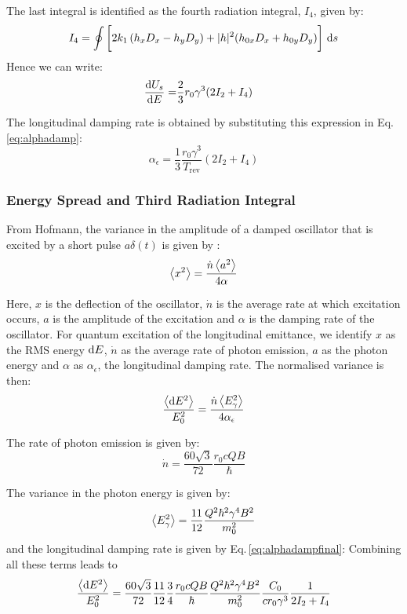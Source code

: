 The last integral is identified as the fourth radiation integral, $I_4$, given by:
\begin{equation}
    I_4 = \oint \bigg[2k_1 \left( h_x D_x - h_y D_y \right) + |h|^2 (h_{0x}D_x + h_{0y} D_y)\bigg] \ \text{d} s
\end{equation}
Hence we can write:
\begin{align}
    \frac{\text{d} {U_s}}{\text{d} {E}} = &\frac{2}{3} r_0 \gamma^3 (2I_2 + I_4 )
\end{align}

The longitudinal damping rate is obtained by substituting this expression in Eq.\,\eqref{eq:alphadamp}:
\begin{equation}
    \alpha_\epsilon =
      \frac{1}{3} \frac{r_0 \gamma^3}{T_\text{rev}} (2I_2 + I_4 )
    \label{eq:alphadampfinal}
\end{equation}


\subsubsection{Energy Spread and Third Radiation Integral}
\label{sec:enespreadandi3}

From Hofmann, the variance in the amplitude of a damped oscillator that is excited by a short pulse $a\delta(t)$ is given by \cite{hofmann_2004}:
\begin{equation}
    \left\langle {x^2} \right\rangle = \frac{\dot{n} \left\langle {a^2} \right\rangle}{4\alpha}
\end{equation}

Here, $x$ is the deflection of the oscillator, $\dot{n}$ is the average rate at which excitation occurs, $a$ is the amplitude of the excitation and $\alpha$ is the damping rate of the oscillator. For quantum excitation of the longitudinal emittance, we identify $x$ as the RMS energy $\text{d} E$, $\dot{n}$ as the average rate of photon emission, $a$ as the photon energy and $\alpha$ as $\alpha_\epsilon$, the longitudinal damping rate. The normalised variance is then:
\begin{equation}
    \frac{\left\langle {\text{d}E^2} \right\rangle}{E_0^2} = \frac{\dot{n} \left\langle {E_\gamma^2} \right\rangle}{4 \alpha_\epsilon}
    \label{eq:notreallycampbell}
\end{equation}

The rate of photon emission is given by:
\begin{equation}
    \dot{n} = \frac{60 \sqrt{3}}{72} \frac{r_0 c Q B}{\hbar}
\end{equation}

The variance in the photon energy is given by:
\begin{equation}
    \left\langle {E_\gamma^2} \right\rangle = \frac{11}{12} \frac{Q^2\hbar^2 \gamma^4 B^2}{m_0^2}
\end{equation}
and the longitudinal damping rate is given by Eq.\,\eqref{eq:alphadampfinal}:
Combining all these terms leads to
\begin{equation}
    \frac{\left\langle {\text{d}E^2} \right\rangle}{E_0^2} = \frac{60 \sqrt{3}}{72} \frac{11}{12} \frac{3}{4} \frac{r_0 c Q B}{\hbar} \frac{Q^2\hbar^2 \gamma^4 B^2}{m_0^2} \frac{C_0}{c r_0 \gamma^3} \frac{1}{2I_2 + I_4}
\end{equation}

